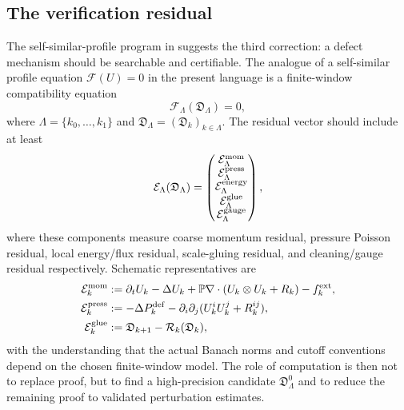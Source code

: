 \documentclass[11pt]{article}
\numberwithin{equation}{section}
\newcommand{\calE}{\mathcal E}
\newcommand{\calF}{\mathcal F}
\newcommand{\calR}{\mathcal R}
\begin{document}
\subsection*{The verification residual}

The self-similar-profile program in \cite{IonescuJiaPalasek2026} suggests the third correction: a defect mechanism should be searchable and certifiable.  The analogue of a self-similar profile equation $\calF(U)=0$ in the present language is a finite-window compatibility equation
\begin{equation}\label{eq:defect-compatibility-equation}
    \calF_\Lambda(\mathfrak D_\Lambda)=0,
\end{equation}
where $\Lambda=\{k_0,\ldots,k_1\}$ and $\mathfrak D_\Lambda=(\mathfrak D_k)_{k\in\Lambda}$.  The residual vector should include at least
\begin{equation}\label{eq:residual-vector}
    \calE_\Lambda(\mathfrak D_\Lambda)
    =
    \begin{pmatrix}
    \calE_\Lambda^{\rm mom}\\
    \calE_\Lambda^{\rm press}\\
    \calE_\Lambda^{\rm energy}\\
    \calE_\Lambda^{\rm glue}\\
    \calE_\Lambda^{\rm gauge}
    \end{pmatrix},
\end{equation}
where these components measure coarse momentum residual, pressure Poisson residual, local energy/flux residual, scale-gluing residual, and cleaning/gauge residual respectively.  Schematic representatives are
\begin{align}
    \calE_k^{\rm mom}
    &:=
    \partial_t U_k-\Delta U_k+
    \mathbb P\nabla\cdot(U_k\otimes U_k+R_k)-f_k^{\rm ext},\label{eq:mom-res}\\
    \calE_k^{\rm press}
    &:=
    -\Delta P_k^{\rm def}-\partial_i\partial_j
    (U_k^iU_k^j+R_k^{ij}),\label{eq:press-res}\\
    \calE_k^{\rm glue}
    &:=
    \mathfrak D_{k+1}-\calR_k(\mathfrak D_k),\label{eq:glue-res}
\end{align}
with the understanding that the actual Banach norms and cutoff conventions depend on the chosen finite-window model.  The role of computation is then not to replace proof, but to find a high-precision candidate $\mathfrak D_\Lambda^0$ and to reduce the remaining proof to validated perturbation estimates.
\end{document}
